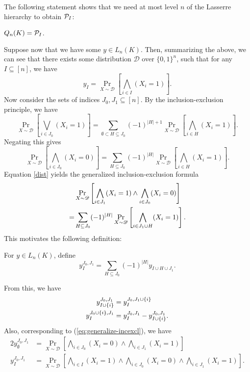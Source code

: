 \documentclass[a4paper,twoside,justified]{tufte-handout}
\begin{document}
The following statement shows that we need at most level $n$ of the Lasserre hierarchy to obtain $\mathcal{P}_{I}$:
\begin{corollary}
  $Q_n(K)=\mathcal{P}_{I}$.
\end{corollary}

Suppose now that we have some $y \in L_n(K)$. Then, summarizing the above,
we can see that there exists some distribution
$\mathscr{D}$ over $\{0,1\}^n$, such that for any $I \subseteq [n]$, we have
\[
y_I = \Pr_{X \sim \mathscr{D}}\left[\bigwedge_{i \in I}(X_i=1)\right].
\]
Now consider the sets of indices $J_0, J_1 \subseteq [n]$. By the inclusion-exclusion principle, we have
\[
\Pr_{X \sim \mathscr{D}}\left[ \bigvee_{i \in J_0} (X_i=1) \right]
=\sum_{\emptyset \subset H \subseteq J_0} (-1)^{|H|+1} \Pr_{X \sim \mathscr{D}}\left[ \bigwedge_{i \in H} (X_i=1) \right].
\]
Negating this gives
\begin{equation}
\label{dist}
\Pr_{X \sim \mathscr{D}}\left[ \bigwedge_{i \in J_0} (X_i=0) \right]
=\sum_{H \subseteq J_0} (-1)^{|H|} \Pr_{X \sim \mathscr{D}}\left[ \bigwedge_{i \in H} (X_i=1) \right].
\end{equation}
Equation \eqref{dist} yields the generalized inclusion-exclusion formula
\begin{alignat}{2}
  & \Pr_{X \sim \mathscr{D}} \left[ \bigwedge_{i \in J_1} (X_i = 1) \wedge \bigwedge_{i \in J_0} (X_i = 0) \right] \notag \\
  =& \sum_{H \subseteq J_0} (-1)^{|H|} \Pr_{X \sim \mathscr{D}}\left[ \bigwedge_{i \in J_1 \cup H} (X_i=1) \right]. \label{eq:generalize-incexcl}
\end{alignat}
This motivates the following definition:
\begin{definition}\label{def:y-inc-exc}
  For $y \in L_n(K)$, define
  \[
  y^{J_0,J_1}_{I} = \sum_{H \subseteq J_0} (-1)^{|H|} y_{I \cup H \cup J_1}.
  \]
\end{definition}
From this, we have
\begin{alignat}{2}
  y^{J_0,J_1}_{I \cup \{i\}} &= y^{J_0,J_1 \cup \{i\}}_{I} \notag \\
  y^{J_0 \cup \{i\},J_1}_{I} &= y^{J_0,J_1}_{I}-y^{J_0,J_1}_{I \cup \{i\}}. \label{eq:yJ0J1properties}
\end{alignat}
Also, corresponding to (\ref{eq:generalize-incexcl}), we have
\begin{alignat*}{2}
  y^{J_0,J_1}_{\emptyset} &= \Pr_{X \sim \mathscr{D}} \left[ \bigwedge_{i \in J_0}(X_i=0) \wedge \bigwedge_{i \in J_1}(X_i=1) \right] \\
  y^{J_0,J_1}_{I} &= \Pr_{X \sim \mathscr{D}} \left[ \bigwedge_{i \in I}(X_i=1) \wedge 
  \bigwedge_{i \in J_0}(X_i=0) \wedge \bigwedge_{i \in J_1}(X_i=1) \right].
\end{alignat*}
\end{document}
